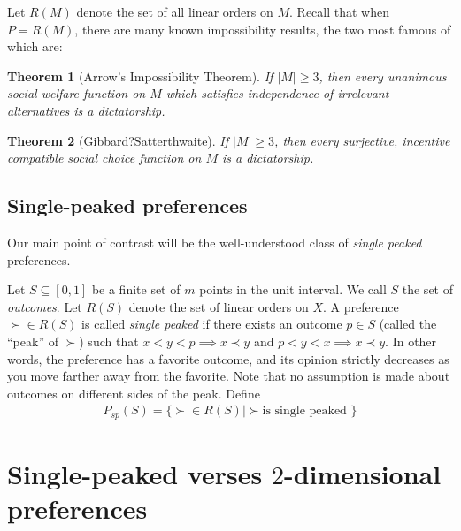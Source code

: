 \documentclass[12pt]{article}
\newtheorem{theorem}{Theorem}
\newcommand{\1}[1]{\mathds{1}[{#1}]}
\begin{document}
    Let $R(M)$ denote the set of all linear orders on $M$.
    Recall that when $P = R(M)$, there are many known impossibility results,
    the two most famous of which are:

    \begin{theorem}[Arrow's Impossibility Theorem]
      If $|M| \ge 3$, then
      every unanimous social welfare function on $M$ which satisfies independence of
      irrelevant alternatives is a dictatorship.
    \end{theorem}

    \begin{theorem}[Gibbard?Satterthwaite]
      If $|M| \ge 3$, then
      every surjective, incentive compatible social choice function on $M$
      is a dictatorship.
    \end{theorem}

  \subsection{Single-peaked preferences}
    Our main point of contrast will be the well-understood class of
    \emph{single peaked} preferences.

    Let $S\subseteq [0,1]$ be a finite set of $m$ points in the unit interval.
    We call $S$ the set of \emph{outcomes}.
    Let $R(S)$ denote the set of linear orders on $X$.
    A preference $\succ \in R(S)$ is called \emph{single peaked} if
    there exists an outcome $p\in S$ (called the ``peak'' of $\succ$)
    such that $x < y < p \implies x \prec y$ and $p < y < x \implies x \prec y$.
    In other words, the preference has a favorite outcome,
    and its opinion strictly decreases as you move farther away from the favorite.
    Note that no assumption is made about outcomes on different sides of the peak.
    Define
    \begin{align*}
      P_{sp}(S) = \{ \succ \in R(S) | \succ \text{is single peaked }\}
    \end{align*}


\section{Single-peaked verses $2$-dimensional preferences}
\end{document}
